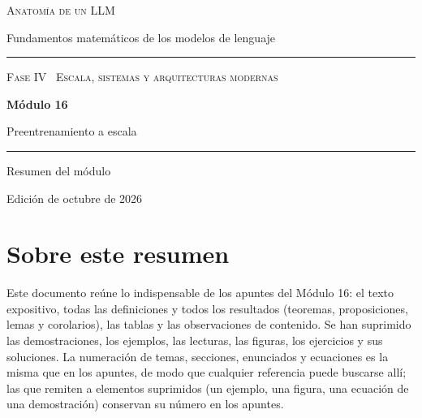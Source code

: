 \documentclass[11pt,a4paper,twoside,openany]{book}
\begin{document}
\frontmatter
\begin{titlepage}
\centering
\vspace*{2.5cm}
{\large\scshape Anatomía de un LLM}\par
\vspace{0.4cm}
{\normalsize Fundamentos matemáticos de los modelos de lenguaje}\par
\vspace{2.2cm}
\rule{\textwidth}{0.8pt}\par\vspace{0.5cm}
{\small\scshape Fase IV \textperiodcentered\ Escala, sistemas y arquitecturas modernas}\par\vspace{0.3cm}
{\Huge\bfseries Módulo 16\par}\vspace{0.3cm}
{\LARGE Preentrenamiento a escala\par}
\vspace{0.5cm}\rule{\textwidth}{0.4pt}\par
\vspace{1.6cm}
{\large Resumen del módulo}\par
\vfill
{\small Edición de octubre de 2026}\par
\end{titlepage}

\chapter*{Sobre este resumen}

Este documento reúne lo indispensable de los apuntes del Módulo 16: el texto expositivo, todas las definiciones y todos los resultados (teoremas, proposiciones, lemas y corolarios), las tablas y las observaciones de contenido. Se han suprimido las demostraciones, los ejemplos, las lecturas, las figuras, los ejercicios y sus soluciones. La numeración de temas, secciones, enunciados y ecuaciones es la misma que en los apuntes, de modo que cualquier referencia puede buscarse allí; las que remiten a elementos suprimidos (un ejemplo, una figura, una ecuación de una demostración) conservan su número en los apuntes.
\end{document}
